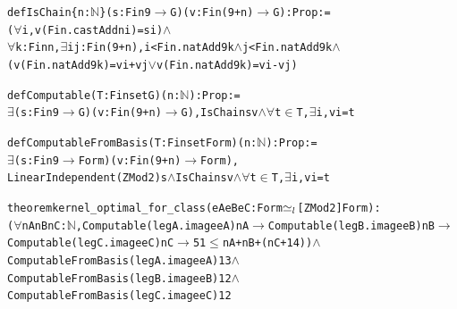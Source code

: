 \begin{alltt}
def IsChain \{n : \(\mathbb{N}\)\} (s : Fin 9 \(\to\) G) (v : Fin (9 + n) \(\to\) G) : Prop :=
  (\(\forall\) i, v (Fin.castAdd n i) = s i) \(\land\)
    \(\forall\) k : Fin n, \(\exists\) i j : Fin (9 + n), i < Fin.natAdd 9 k \(\land\) j < Fin.natAdd 9 k \(\land\)
      (v (Fin.natAdd 9 k) = v i + v j \(\lor\) v (Fin.natAdd 9 k) = v i - v j)

def Computable (T : Finset G) (n : \(\mathbb{N}\)) : Prop :=
  \(\exists\) (s : Fin 9 \(\to\) G) (v : Fin (9 + n) \(\to\) G), IsChain s v \(\land\) \(\forall\) t \(\in\) T, \(\exists\) i, v i = t

def ComputableFromBasis (T : Finset Form) (n : \(\mathbb{N}\)) : Prop :=
  \(\exists\) (s : Fin 9 \(\to\) Form) (v : Fin (9 + n) \(\to\) Form),
    LinearIndependent (ZMod 2) s \(\land\) IsChain s v \(\land\) \(\forall\) t \(\in\) T, \(\exists\) i, v i = t

theorem kernel_optimal_for_class (eA eB eC : Form \(\simeq\sb{l}\)[ZMod 2] Form) :
    (\(\forall\) nA nB nC : \(\mathbb{N}\), Computable (legA.image eA) nA \(\to\) Computable (legB.image eB) nB \(\to\)
        Computable (legC.image eC) nC \(\to\) 51 \(\le\) nA + nB + (nC + 14)) \(\land\)
      ComputableFromBasis (legA.image eA) 13 \(\land\) ComputableFromBasis (legB.image eB) 12 \(\land\)
      ComputableFromBasis (legC.image eC) 12
\end{alltt}

